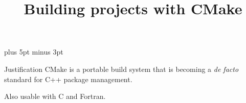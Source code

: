 \documentclass[11pt,headernav]{beamer}
\begin{document}
\parskip=10pt plus 5pt minus 3pt

\title{Building projects with CMake}
\author{\hpcteachers}
\date{\hpcsemester}

\begin{frame}
  \titlepage
\end{frame}

\begin{frame}{Justification}
  CMake is a portable build system that is
  becoming a \emph{de facto} standard for C++ package management.

  Also usable with C and Fortran.
\end{frame}


\end{document}
